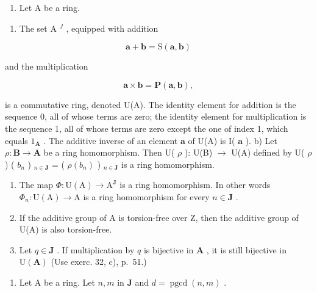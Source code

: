\begin{enumerate}
\def\labelenumi{\arabic{enumi})}
\setcounter{enumi}{34}
\tightlist
\item
  Let A be a ring.
\end{enumerate}

\begin{enumerate}
\def\labelenumi{\alph{enumi})}
\tightlist
\item
  The set A \(^{J}\) , equipped with addition
\end{enumerate}

\[
\boldsymbol {a} + \boldsymbol {b} = \mathrm{S} (\boldsymbol {a}, \boldsymbol {b})
\]

and the multiplication

\[
\boldsymbol {a} \times \boldsymbol {b} = \mathbf {P} (\boldsymbol {a}, \boldsymbol {b}),
\]

is a commutative ring, denoted U(A). The identity element for addition is the sequence 0, all of whose terms are zero; the identity element for multiplication is the sequence 1, all of whose terms are zero except the one of index 1, which equals \(1_{\mathbf{A}}\) . The additive inverse of an element \(\boldsymbol{a}\) of U(A) is I( \(\boldsymbol{a}\) ). b) Let \(\rho: \mathbf{B} \to \mathbf{A}\) be a ring homomorphism. Then U( \(\rho\) ): U(B) \(\to\) U(A) defined by U( \(\rho\) ) ( \(b_n\) ) \(_{n \in \mathbf{J}}\) = ( \(\rho(b_n)\) ) \(_{n \in \mathbf{J}}\) is a ring homomorphism.

\begin{enumerate}
\def\labelenumi{\alph{enumi})}
\setcounter{enumi}{2}
\item
  The map \(\Phi: \mathrm{U}(\mathrm{A}) \to \mathrm{A}^{\mathbf{J}}\) is a ring homomorphism. In other words \(\Phi_{n}: \mathrm{U}(\mathrm{A}) \to \mathrm{A}\) is a ring homomorphism for every \(n \in \mathbf{J}\) .
\item
  If the additive group of A is torsion-free over Z, then the additive group of U(A) is also torsion-free.
\item
  Let \(q \in \mathbf{J}\) . If multiplication by \(q\) is bijective in \(\mathbf{A}\) , it is still bijective in \(\mathrm{U}(\mathbf{A})\) (Use exerc. 32, c), p.~51.)
\end{enumerate}

\begin{enumerate}
\def\labelenumi{\arabic{enumi})}
\setcounter{enumi}{35}
\tightlist
\item
  Let A be a ring. Let \(n, m\) in \(\mathbf{J}\) and \(d = \operatorname{pgcd}(n, m)\) .
\end{enumerate}

